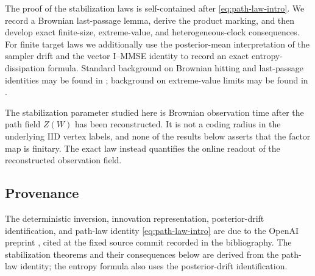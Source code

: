 The proof of the stabilization laws is self-contained after
\eqref{eq:path-law-intro}.  We record a Brownian last-passage lemma, derive the
product marking, and then develop exact finite-size, extreme-value, and
heterogeneous-clock consequences.  For finite target laws we additionally use
the posterior-mean interpretation of the sampler drift and the vector
I--MMSE identity to record an exact entropy-dissipation formula.  Standard
background on Brownian hitting and last-passage identities may be found in
\cite{KaratzasShreve1991,RevuzYor1999,BorodinSalminen2002}; background on
extreme-value limits may be found in \cite{Resnick1987}.

The stabilization parameter studied here is Brownian observation time after
the path field $Z(W)$ has been reconstructed.  It is not a coding radius in
the underlying IID vertex labels, and none of the results below asserts that
the factor map is finitary.  The exact law instead quantifies the online
readout of the reconstructed observation field.

\subsection*{Provenance}
The deterministic inversion, innovation representation, posterior-drift
identification, and path-law identity \eqref{eq:path-law-intro} are due to the
OpenAI preprint \cite{OpenAI2026FUSF}, cited at the fixed source commit recorded
in the bibliography.  The stabilization theorems and their consequences below
are derived from the path-law identity; the entropy formula also uses the
posterior-drift identification.
